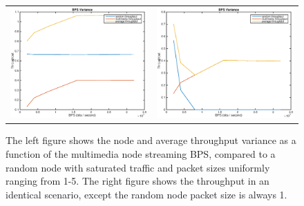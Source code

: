 \begin{figure}
\begin{center}
\begin{tabular}{cc}
\includegraphics[scale=0.35]{../../src/fig-simulation_random_multimedia-bps-1_0_1_0_12000.eps} & \includegraphics[scale=0.35]{../../src/fig-simulation_random_multimedia-bps-1_0_5_0_12000.eps}
\end{tabular}
\caption{The left figure shows the node and average throughput variance as a function of the multimedia node streaming BPS, compared to a random node with saturated traffic and packet sizes uniformly ranging from 1-5. The right figure shows the throughput in an identical scenario, except the random node packet size is always 1.}
\label{fig:randomstuff1}
\end{center}
\end{figure}

